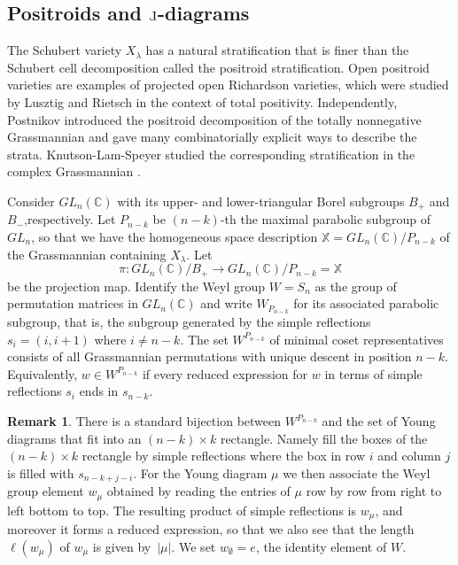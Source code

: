 \documentclass{amsart}
\def\Le{\hbox{\rotatebox[origin=c]{180}{$\Gamma$}}}
\theoremstyle{definition}
\newtheorem{remark}[thm]{Remark}
\numberwithin{equation}{section}
\newcommand{\C}{\mathbb{C}}
\begin{document}
\subsection{Positroids and $\Le$-diagrams}\label{s:LeDivisors}
The Schubert variety $X_\lambda$ has a natural stratification that is finer than the Schubert cell decomposition called the positroid stratification.
Open positroid varieties are examples of projected open Richardson varieties, which 
were studied by Lusztig \cite{Lusztig3} and Rietsch \cite{RietschThesis} in the 
context of total positivity. Independently, Postnikov introduced the positroid decomposition of the totally nonnegative Grassmannian \cite{Postnikov}
and gave many combinatorially explicit ways to describe the strata. Knutson-Lam-Speyer studied the corresponding stratification in the complex 
Grassmannian \cite{KLS}. 



Consider $GL_n(\C)$ with its upper- and lower-triangular Borel subgroups $B_+$ and $B_-$,respectively. Let $P_{n-k}$ be $(n-k)$-th the maximal parabolic subgroup of $GL_n$, so that we have the homogeneous space description $\mathbb X=GL_n(\C)/P_{n-k}$ of the Grassmannian  containing $X_\lambda$. Let 
\[
\pi:GL_{n}(\C)/B_+\to  GL_n(\C)/P_{n-k}=\mathbb X
\]
be the projection map. Identify the Weyl group $W=S_n$ as the group of permutation matrices in $GL_n(\C)$ and write $W_{P_{n-k}}$ for its associated parabolic subgroup, that is, the subgroup generated by the simple reflections $s_i=(i,i+1)$ where $i\ne n-k$.   
The set $W^{P_{n-k}}$ of minimal coset representatives consists of all Grassmannian permutations with unique descent in position $n-k$. Equivalently, $w\in W^{P_{n-k}}$ if every reduced expression for $w$ in terms of simple reflections $s_i$ ends in $s_{n-k}$. 


\begin{remark}\label{r:Young2} There is a standard bijection between $W^{P_{n-k}}$ and the set of Young diagrams that fit into an $(n-k)\times k$ rectangle. Namely fill the boxes of the $(n-k)\times k$ rectangle by simple reflections where the box in row $i$ and column $j$ is filled with $s_{n-k+j-i}$. For the Young diagram $\mu$ we then associate the Weyl group element $w_\mu$ obtained by reading the entries of $\mu$ row by row from right to left bottom to top. The resulting product of simple reflections is $w_\mu$, and moreover it forms a reduced expression, so that we also see that the length $\ell(w_\mu)$ of $w_\mu$ is given by~$|\mu|$. We set $w_\emptyset=e$, the identity element of $W$. 
\end{remark}
\end{document}
